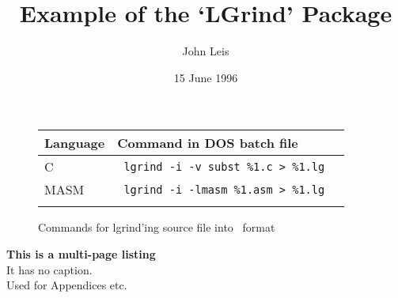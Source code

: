 \documentclass[a4paper]{article}
\begin{document}
\title{ Example of the `LGrind' Package }
\author{ John Leis }
\date{ 15 June 1996 }
\maketitle

\clearpage

\begin{figure}
	\begin{center}
		\begin{tabular}{ll}
			\hline\hline 
			Language & Command in DOS batch file \\
			\hline 
			C       & \verb+ lgrind -i -v subst %1.c > %1.lg  + \\
			MASM    & \verb+ lgrind -i -lmasm %1.asm > %1.lg  + \\
			\hline \\
		\end{tabular}
	\end{center}
	\caption{Commands for lgrind'ing source file into \LaTeXe\ format}
	\label{fig:commands}
\end{figure}



\clearpage
\begin{center}
	\textbf{\large This is a multi-page listing} \\
	It has no caption. \\
	Used for Appendices etc. \\
\end{center}

\end{document}
